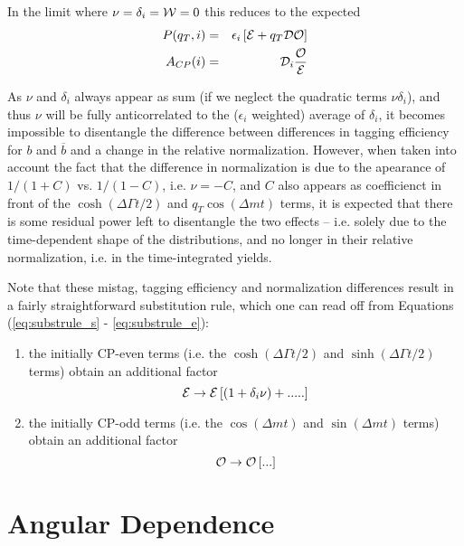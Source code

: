 \documentclass[a4paper,9pt,twoside]{article}
\begin{document}
In the limit where $\nu=\delta_i={\cal W}=0$ this reduces to the expected
\begin{eqnarray}
   P(q_T,i) &=& \epsilon_i\left[  {\cal E} +q_T {\cal D} {\cal O}\right]  \\
   A_{CP}(i) &=&  {\cal D}_i\frac{\cal O }{\cal E}
\end{eqnarray}

As $\nu$ and $\delta_i$ always appear as sum (if we neglect the quadratic terms $\nu\delta_i$), and thus $\nu$ will be fully anticorrelated to the ($\epsilon_i$ weighted) average of $\delta_i$,
it becomes impossible to disentangle the difference between differences in tagging efficiency for $b$ and $\overline{b}$
and a change in the relative normalization. However, when taken into account the fact that the difference in normalization
is due to the apearance of $1/(1+C)$ vs. $1/(1-C)$, i.e. $\nu = -C$, and $C$ also appears as coefficienct in front of the $\cosh\left(\Delta\Gamma t/2\right)$
and $q_T\cos(\Delta m t)$ terms, it is expected that there is some residual power left to disentangle the two effects -- i.e. 
solely due to the time-dependent shape of the distributions, and no longer in their relative normalization, i.e. in the time-integrated yields.


Note that these mistag, tagging efficiency and normalization differences result in a fairly 
straightforward substitution rule, which one can read off from Equations (\ref{eq:substrule_s} - \ref{eq:substrule_e}):
\begin{enumerate}
\item
the initially CP-even terms (i.e. the $\cosh(\Delta\Gamma t/2)$ and $\sinh(\Delta\Gamma t/2)$ terms) obtain an additional
factor 
\begin{equation}
   {\cal E} \rightarrow {\cal E} \left[ (1+\delta_i\nu) + ..... \right]
\end{equation}
\item
the initially CP-odd terms (i.e. the $\cos(\Delta m t) $ and $\sin(\Delta m t)$ terms) obtain an additional
factor 
\begin{equation}
   {\cal O} \rightarrow {\cal O} \left[ ... \right]
\end{equation}
\end{enumerate}

\vfill
\pagebreak

\section{Angular Dependence}
\end{document}
